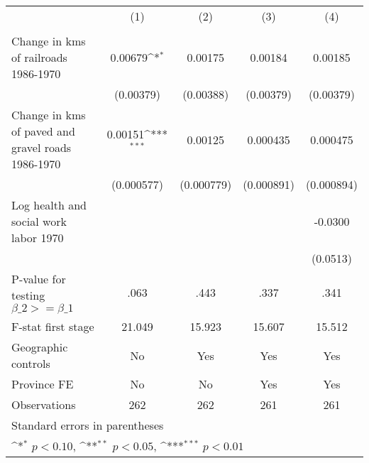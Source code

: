 {
\def\sym#1{\ifmmode^{#1}\else\(^{#1}\)\fi}
\begin{tabular}{l*{4}{c}}
\hline\hline
                &\multicolumn{1}{c}{(1)}&\multicolumn{1}{c}{(2)}&\multicolumn{1}{c}{(3)}&\multicolumn{1}{c}{(4)}\\
                &\multicolumn{1}{c}{}&\multicolumn{1}{c}{}&\multicolumn{1}{c}{}&\multicolumn{1}{c}{}\\
\hline
Change in kms of railroads 1986-1970&  0.00679\sym{*}  &  0.00175         &  0.00184         &  0.00185         \\
                &(0.00379)         &(0.00388)         &(0.00379)         &(0.00379)         \\
[1em]
Change in kms of paved and gravel roads 1986-1970&  0.00151\sym{***}&  0.00125         & 0.000435         & 0.000475         \\
                &(0.000577)         &(0.000779)         &(0.000891)         &(0.000894)         \\
[1em]
Log health and social work labor 1970&                  &                  &                  &  -0.0300         \\
                &                  &                  &                  & (0.0513)         \\
\hline
P-value for testing $\beta\_{2} >= \beta\_{1}$&     .063         &     .443         &     .337         &     .341         \\
F-stat first stage&   21.049         &   15.923         &   15.607         &   15.512         \\
Geographic controls&       No         &      Yes         &      Yes         &      Yes         \\
Province FE     &       No         &       No         &      Yes         &      Yes         \\
Observations    &      262         &      262         &      261         &      261         \\
\hline\hline
\multicolumn{5}{l}{\footnotesize Standard errors in parentheses}\\
\multicolumn{5}{l}{\footnotesize \sym{*} \(p<0.10\), \sym{**} \(p<0.05\), \sym{***} \(p<0.01\)}\\
\end{tabular}
}
